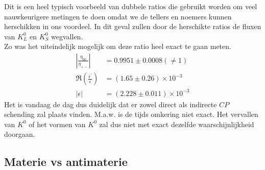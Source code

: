 \documentclass[../main.tex]{subfiles}
\begin{document}
Dit is een heel typisch voorbeeld van dubbele ratios die gebruikt worden om veel nauwkeurigere metingen te doen omdat we de tellers en noemers kunnen herschikken in ons voordeel. In dit geval zullen door de herschikte ratios de fluxen van $K_L^0$ en $K_S^0$ wegvallen.\\
Zo was het uiteindelijk mogelijk om deze ratio heel exact te gaan meten.
\begin{equation}
    \begin{aligned}
        \label{eq:eta_ratio_results}
        \left|\frac{\eta_{00}}{\eta_{+-}}\right| &=0.9951 \pm 0.0008(\neq 1) \\
        \Re\left(\frac{\epsilon^{\prime}}{\epsilon}\right) &=(1.65 \pm 0.26) \times 10^{-3} \\
        |\epsilon| &=(2.228 \pm 0.011) \times 10^{-3}
    \end{aligned}
\end{equation}
Het is vandaag de dag dus duidelijk dat er zowel direct als indirecte $CP$ schending zal plaats vinden. M.a.w. is de tijds omkering niet exact. Het vervallen van $K^0$ of het vormen van $K^0$ zal dus niet met exact dezelfde waarschijnlijkheid doorgaan.

\subsection{Materie vs antimaterie}%
\label{sub:materie_vs_antimaterie}
\end{document}
